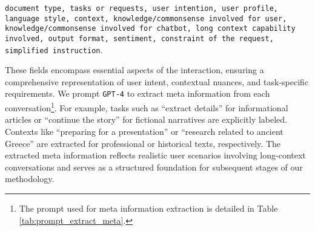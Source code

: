 \small{\texttt{document type, tasks or requests, user intention, user profile, language style, context, knowledge/commonsense involved for user, knowledge/commonsense involved for chatbot, long context capability involved, output format, sentiment, constraint of the request, simplified instruction}}.

These fields encompass essential aspects of the interaction, ensuring a comprehensive representation of user intent, contextual nuances, and task-specific requirements.
We prompt {\tt GPT-4} to extract meta information from each conversation\footnote{The prompt used for meta information extraction is detailed in Table \ref{tab:prompt_extract_meta}.}. For example, tasks such as ``extract details'' for informational articles or ``continue the story'' for fictional narratives are explicitly labeled. Contexts like ``preparing for a presentation'' or ``research related to ancient Greece'' are extracted for professional or historical texts, respectively.
The extracted meta information reflects realistic user scenarios involving long-context conversations and serves as a structured foundation for subsequent stages of our methodology.



